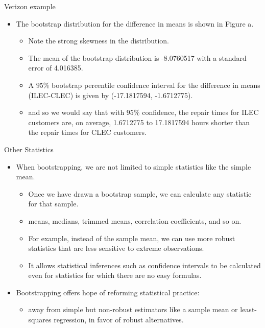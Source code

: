 \documentclass[
  ignorenonframetext,
]{beamer}
\providecommand{\tightlist}{%
  \setlength{\itemsep}{0pt}\setlength{\parskip}{0pt}}
\begin{document}
\begin{frame}{Verizon example}
\protect\hypertarget{verizon-example-8}{}
\begin{itemize}
\item
  The bootstrap distribution for the difference in means is shown in
  Figure a.

  \begin{itemize}
  \tightlist
  \item
    Note the strong skewness in the distribution.
  \item
    The mean of the bootstrap distribution is -8.0760517 with a standard
    error of 4.016385.
  \item
    A \(95\%\) bootstrap percentile confidence interval for the
    difference in means (ILEC-CLEC) is given by (-17.1817594,
    -1.6712775).
  \item
    and so we would say that with \(95\%\) confidence, the repair times
    for ILEC customers are, on average, 1.6712775 to 17.1817594 hours
    shorter than the repair times for CLEC customers.
  \end{itemize}
\end{itemize}
\end{frame}

\begin{frame}{Other Statistics}
\protect\hypertarget{other-statistics}{}
\begin{itemize}
\item
  When bootstrapping, we are not limited to simple statistics like the
  simple mean.

  \begin{itemize}
  \tightlist
  \item
    Once we have drawn a bootstrap sample, we can calculate any
    statistic for that sample.
  \item
    means, medians, trimmed means, correlation coefficients, and so on.
  \item
    For example, instead of the sample mean, we can use more robust
    statistics that are less sensitive to extreme observations.
  \item
    It allows statistical inferences such as confidence intervals to be
    calculated even for statistics for which there are no easy formulas.
  \end{itemize}
\item
  Bootstrapping offers hope of reforming statistical practice:

  \begin{itemize}
  \tightlist
  \item
    away from simple but non-robust estimators like a sample mean or
    least-squares regression, in favor of robust alternatives.
  \end{itemize}
\end{itemize}
\end{frame}
\end{document}
